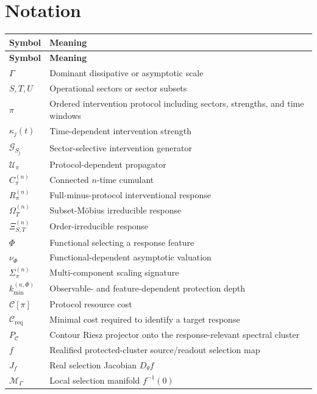 \documentclass[11pt]{article}
\theoremstyle{definition}
\theoremstyle{remark}
\newcommand{\cU}{\mathcal U}
\newcommand{\cG}{\mathcal G}
\newcommand{\cC}{\mathcal C}
\newcommand{\PhiF}{\Phi}
\newcommand{\OmegaI}{\Omega}
\newcommand{\XiI}{\Xi}
\newcommand{\cM}{\mathcal M}
\begin{document}
\appendix

\section{Notation}

\begin{longtable}{>{\raggedright\arraybackslash}p{} >{\raggedright\arraybackslash}p{}}
\toprule
\textbf{Symbol} & \textbf{Meaning}\\
\midrule
\endfirsthead
\toprule
\textbf{Symbol} & \textbf{Meaning}\\
\midrule
\endhead
$\Gamma$ & Dominant dissipative or asymptotic scale\\
$S,T,U$ & Operational sectors or sector subsets\\
$\pi$ & Ordered intervention protocol including sectors, strengths, and time windows\\
$\kappa_j(t)$ & Time-dependent intervention strength\\
$\cG_{S_j}$ & Sector-selective intervention generator\\
$\cU_{\pi}$ & Protocol-dependent propagator\\
$C_{\pi}^{(n)}$ & Connected $n$-time cumulant\\
$R_{\pi}^{(n)}$ & Full-minus-protocol interventional response\\
$\OmegaI_T^{(n)}$ & Subset-M\"obius irreducible response\\
$\XiI_{S,T}^{(n)}$ & Order-irreducible response\\
$\PhiF$ & Functional selecting a response feature\\
$\nu_{\PhiF}$ & Functional-dependent asymptotic valuation\\
$\Sigma_{\pi}^{(n)}$ & Multi-component scaling signature\\
$k_{\min}^{(n,\PhiF)}$ & Observable- and feature-dependent protection depth\\
$\cC[\pi]$ & Protocol resource cost\\
$\cC_{\mathrm{req}}$ & Minimal cost required to identify a target response\\
$P_{\cC}$ & Contour Riesz projector onto the response-relevant spectral cluster\\
$f$ & Realified protected-cluster source/readout selection map\\
$J_f$ & Real selection Jacobian $D_\theta f$\\
$\cM_\Gamma$ & Local selection manifold $f^{-1}(0)$\\

\end{longtable}
\end{document}
